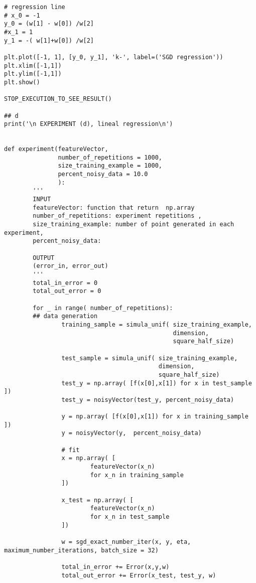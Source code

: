 \begin{verbatim}
# regression line
# x_0 = -1
y_0 = (w[1] - w[0]) /w[2]
#x_1 = 1
y_1 = -( w[1]+w[0]) /w[2]

plt.plot([-1, 1], [y_0, y_1], 'k-', label=('SGD regression'))
plt.xlim([-1,1])
plt.ylim([-1,1])
plt.show()

STOP_EXECUTION_TO_SEE_RESULT()

## d
print('\n EXPERIMENT (d), lineal regression\n')

        
def experiment(featureVector,
               number_of_repetitions = 1000,
               size_training_example = 1000,
               percent_noisy_data = 10.0
               ):
        '''
        INPUT
        featureVector: function that return  np.array 
        number_of_repetitions: experiment repetitions ,
        size_training_example: number of point generated in each experiment,
        percent_noisy_data: 

        OUTPUT
        (error_in, error_out)
        ''' 
        total_in_error = 0
        total_out_error = 0

        for _ in range( number_of_repetitions):
        ## data generation 
                training_sample = simula_unif( size_training_example,
                                               dimension,
                                               square_half_size)

                test_sample = simula_unif( size_training_example,
                                           dimension,
                                           square_half_size)
                test_y = np.array( [f(x[0],x[1]) for x in test_sample ])
                test_y = noisyVector(test_y, percent_noisy_data)
        
                y = np.array( [f(x[0],x[1]) for x in training_sample ])
                y = noisyVector(y,  percent_noisy_data)
 
                # fit
                x = np.array( [
                        featureVector(x_n)
                        for x_n in training_sample
                ])

                x_test = np.array( [
                        featureVector(x_n)
                        for x_n in test_sample
                ])
                
                w = sgd_exact_number_iter(x, y, eta, maximum_number_iterations, batch_size = 32)

                total_in_error += Error(x,y,w)
                total_out_error += Error(x_test, test_y, w)
                

\end{verbatim}
